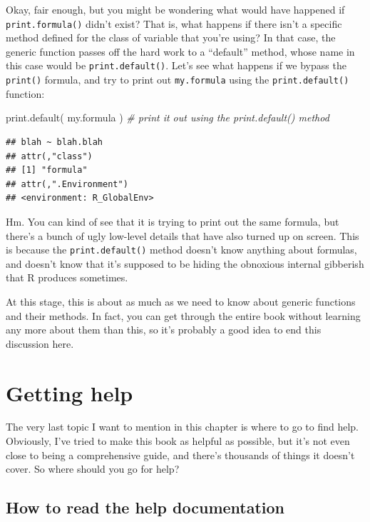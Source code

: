 \documentclass[
]{book}
\newenvironment{Shaded}{\begin{snugshade}}{\end{snugshade}}
\newcommand{\CommentTok}[1]{\textcolor[rgb]{0.56,0.35,0.01}{\textit{#1}}}
\newcommand{\FunctionTok}[1]{\textcolor[rgb]{0.00,0.00,0.00}{#1}}
\newcommand{\NormalTok}[1]{#1}
\begin{document}
Okay, fair enough, but you might be wondering what would have happened if \texttt{print.formula()} didn't exist? That is, what happens if there isn't a specific method defined for the class of variable that you're using? In that case, the generic function passes off the hard work to a ``default'' method, whose name in this case would be \texttt{print.default()}. Let's see what happens if we bypass the \texttt{print()} formula, and try to print out \texttt{my.formula} using the \texttt{print.default()} function:

\begin{Shaded}
\begin{Highlighting}[]
\FunctionTok{print.default}\NormalTok{( my.formula )      }\CommentTok{\# print it out using the print.default() method}
\end{Highlighting}
\end{Shaded}

\begin{verbatim}
## blah ~ blah.blah
## attr(,"class")
## [1] "formula"
## attr(,".Environment")
## <environment: R_GlobalEnv>
\end{verbatim}

Hm. You can kind of see that it is trying to print out the same formula, but there's a bunch of ugly low-level details that have also turned up on screen. This is because the \texttt{print.default()} method doesn't know anything about formulas, and doesn't know that it's supposed to be hiding the obnoxious internal gibberish that R produces sometimes.

At this stage, this is about as much as we need to know about generic functions and their methods. In fact, you can get through the entire book without learning any more about them than this, so it's probably a good idea to end this discussion here.

\hypertarget{help}{%
\section{Getting help}\label{help}}

The very last topic I want to mention in this chapter is where to go to find help. Obviously, I've tried to make this book as helpful as possible, but it's not even close to being a comprehensive guide, and there's thousands of things it doesn't cover. So where should you go for help?

\hypertarget{how-to-read-the-help-documentation}{%
\subsection{How to read the help documentation}\label{how-to-read-the-help-documentation}}
\end{document}
